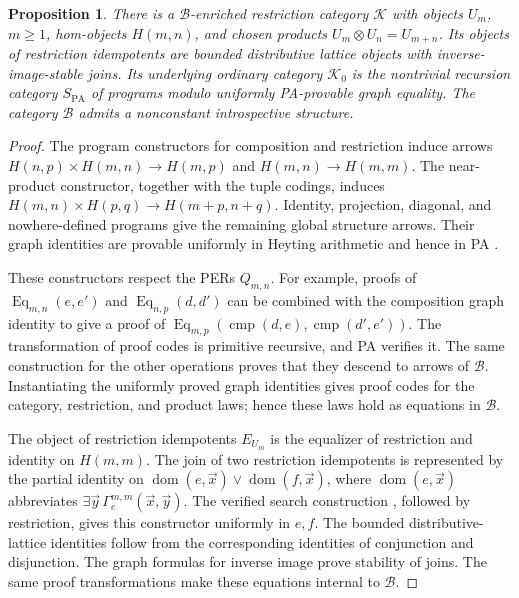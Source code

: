 \documentclass[11pt]{article}
\newtheorem{proposition}[theorem]{Proposition}
\theoremstyle{definition}
\theoremstyle{remark}
\begin{document}
\begin{proposition}\label{prop:pa-enriched-recursion-category}
There is a $\mathcal B$-enriched restriction category $\mathcal K$
with objects $U_m$, $m\ge1$, hom-objects $H(m,n)$, and chosen
products $U_m\otimes U_n=U_{m+n}$. Its objects of restriction idempotents are bounded
distributive lattice objects with inverse-image-stable joins. Its underlying
ordinary category $\mathcal K_0$ is the nontrivial recursion category
$S_{\mathrm{PA}}$ of programs modulo uniformly PA-provable graph
equality. The category $\mathcal B$ admits a nonconstant
introspective structure.
\end{proposition}
\begin{proof}
The program constructors for composition and restriction induce
arrows $H(n,p)\times H(m,n)\to H(m,p)$ and
$H(m,n)\to H(m,m)$. The near-product constructor, together
with the tuple codings, induces
$H(m,n)\times H(p,q)\to H(m+p,n+q)$.
Identity, projection, diagonal, and nowhere-defined programs
give the remaining global structure arrows.
Their graph identities are provable uniformly in Heyting arithmetic
and hence in PA \cite[Lemmas~7.1--7.3]{RecursionCompletions}.

These constructors respect the PERs $Q_{m,n}$. For example,
proofs of $\operatorname{Eq}_{m,n}(e,e')$ and
$\operatorname{Eq}_{n,p}(d,d')$ can be combined with the composition
graph identity to give a proof of
$\operatorname{Eq}_{m,p}(\operatorname{cmp}(d,e),
\operatorname{cmp}(d',e'))$. The transformation of proof codes
is primitive recursive, and PA verifies it. The same construction
for the other operations proves that they descend to arrows of
$\mathcal B$. Instantiating the uniformly proved graph identities
gives proof codes for the category, restriction, and product laws;
hence these laws hold as equations in $\mathcal B$.

The object of restriction idempotents $E_{U_m}$ is the equalizer of restriction and
identity on $H(m,m)$. The join of two restriction idempotents is represented by
the partial identity on
$\operatorname{dom}(e,\vec x)\vee
\operatorname{dom}(f,\vec x)$, where
$\operatorname{dom}(e,\vec x)$ abbreviates
$\exists\vec y\,\Gamma_e^{m,m}(\vec x,\vec y)$.
The verified search construction
\cite[Lemma~7.6]{RecursionCompletions}, followed by restriction,
gives this constructor uniformly in $e,f$.
The bounded distributive-lattice identities follow from the
corresponding identities of conjunction and disjunction.
The graph formulas for inverse image prove stability of joins.
The same proof transformations make these equations internal
to $\mathcal B$.


\end{proof}
\end{document}
